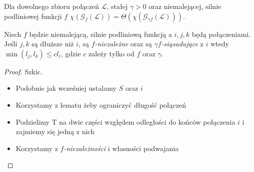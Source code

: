 \documentclass[polish, t,10pt]{beamer}
\begin{document}
    \begin{frame}
        \begin{theorem}
            Dla dowolnego zbioru połączeń $\mathcal{L}$, stałej $\gamma > 0$ oraz niemalejącej, silnie podliniowej funkcji $f$
            $\chi(\mathcal{G}_f(\mathcal{L})) = \Theta(\chi(\mathcal{G}_{\gamma f}(\mathcal{L})))$.
        \end{theorem}
        \begin{lemma}[1]
            Niech $f$ będzie niemalejącą, silnie podliniową funkcją a $i,j,k$ będą połączeniami. Jeśli $j,k$ są dłuższe niż $i$, są \textit{$f$-niezależne} oraz są \textit{$\gamma f$-siąsadujące} z $i$ wtedy $\min (l_j,l_k) \le cl_i$, gdzie $c$ zależy tylko od $f$ oraz $\gamma$.
        \end{lemma}
        \begin{proof}
            Szkic.
            \begin{itemize}
                \item Podobnie jak wcześniej ustalamy $S$ oraz $i$
                \item Korzystamy z lematu żeby ograniczyć długość połączeń
                \item Podzielimy T na dwie części względem odległości do końców połączenia $i$ i zajmiemy się jedną z nich
                \item Korzystamy z \textit{$f$-niezależności} i własności podwajania
            \end{itemize}
        \end{proof}
    \end{frame}
\end{document}
